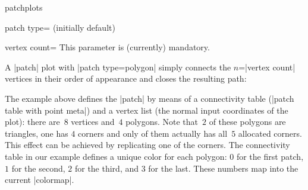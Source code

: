 \begin{pgfplotslibrary}{patchplots}
\begin{pgfplotskey}{patch type= (initially default)}
\begin{pgfplotskey}{vertex count=}
		This parameter is (currently) mandatory.
	\end{pgfplotskey}
	A |patch| plot with |patch type=polygon| simply connects the $n$=|vertex count| vertices in their order of appearance and closes the resulting path:
\begin{codeexample}[]
\end{codeexample}
	\noindent The example above defines the |patch| by means of a connectivity table (|patch table with point meta|) and a vertex list (the normal input coordinates of the plot): there are~$8$ vertices and~$4$ polygons. Note that~$2$ of these polygons are triangles, one has $4$ corners and only of them actually has all~$5$ allocated corners. This effect can be achieved by replicating one of the corners. The connectivity table in our example defines a unique color for each polygon: $0$ for the first patch, $1$ for the second, $2$ for the third, and $3$ for the last. These numbers map into the current |colormap|.
	

\end{pgfplotskey}
\end{pgfplotslibrary}

